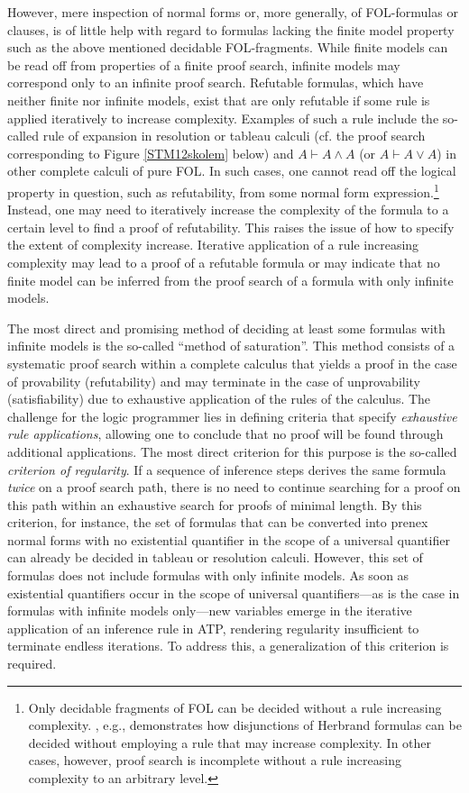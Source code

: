 \documentclass[%
  manuscript=article,   %
  year=2024,
  volume=77,
  doi=00000.000,
]{zfn}
\begin{document}
However, mere inspection of normal forms or, more generally, of FOL-formulas or clauses, is of little help with regard to formulas lacking the finite model property such as the above mentioned decidable FOL-fragments. While finite models can be read off from properties of a finite proof search, infinite models may correspond only to an infinite proof search. Refutable formulas, which have neither finite nor infinite models, exist that are only refutable if some rule is applied iteratively to increase complexity. Examples of such a rule include the so-called rule of expansion in resolution or tableau calculi (cf. the proof search corresponding to Figure \ref{STM12skolem} below) and $A \vdash A \wedge A$ (or $A \vdash A \vee A$) in other complete calculi of pure FOL. In such cases, one cannot read off the logical property in question, such as refutability, from some normal form expression.\footnote{Only decidable fragments of FOL can be decided without a rule increasing complexity. \parencite{Lampert1}, e.g., demonstrates how disjunctions of Herbrand formulas can be decided without employing a rule that may increase complexity. In other cases, however, proof search is incomplete without a rule increasing complexity to an arbitrary level.} Instead, one may need to iteratively increase the complexity of the formula to a certain level to find a proof of refutability. This raises the issue of how to specify the extent of  complexity increase.
Iterative application of a rule increasing complexity may lead to a proof of a refutable formula or may indicate that no finite model can be inferred from the proof search of a formula with only infinite models.

The most direct and promising method of deciding at least some formulas with infinite models is the so-called ``method of saturation''. This method consists of a systematic proof search within a complete calculus that yields a proof in the case of provability (refutability) and may terminate in the case of unprovability (satisfiability) due to exhaustive application of the rules of the calculus. The challenge for the logic programmer lies in defining criteria that specify \emph{exhaustive rule applications}, allowing one to conclude that no proof will be found through additional applications. The most direct criterion for this purpose is the so-called \emph{criterion of regularity}. If a sequence of inference steps derives the same formula \emph{twice} on a proof search path, there is no need to continue searching for a proof on this path within an exhaustive search for proofs of minimal length. By this criterion, for instance, the set of formulas that can be converted into prenex normal forms with no existential quantifier in the scope of a universal quantifier can already be decided in tableau or resolution calculi. However, this set of formulas does not include formulas with only infinite models. 
As soon as existential quantifiers occur in the scope of universal quantifiers---as is the case in formulas with infinite models only---new variables emerge in the iterative application of an inference rule in ATP, rendering regularity insufficient to terminate endless iterations.
To address this, a generalization of this criterion is required.
\end{document}
